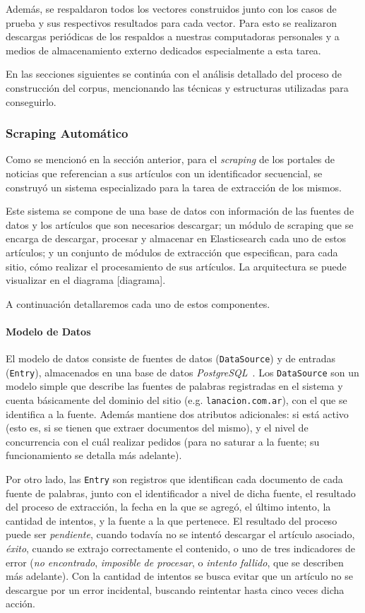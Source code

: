 Además, se respaldaron todos los vectores construidos junto con los casos de prueba y sus respectivos
resultados para cada vector. Para esto se realizaron descargas periódicas de los respaldos a nuestras
computadoras personales y a medios de almacenamiento externo dedicados especialmente a esta
tarea.

En las secciones siguientes se continúa con el análisis detallado del proceso de construcción del corpus,
mencionando las técnicas y estructuras utilizadas para conseguirlo.


\subsubsection{Scraping Automático}

Como se mencionó en la sección anterior, para el \textit{scraping} de los portales de noticias que
referencian a sus artículos con un identificador secuencial, se construyó un sistema especializado
para la tarea de extracción de los mismos.

Este sistema se compone de una base de datos con información de las fuentes de datos y los
artículos que son necesarios descargar; un módulo de scraping que se encarga de descargar, procesar
y almacenar en Elasticsearch cada uno de estos artículos; y un conjunto de módulos de extracción que
especifican, para cada sitio, cómo realizar el procesamiento de sus artículos. La arquitectura se
puede visualizar en el diagrama [diagrama].

A continuación detallaremos cada uno de estos componentes.


\paragraph{Modelo de Datos}

El modelo de datos consiste de fuentes de datos (\texttt{DataSource}) y de entradas
(\texttt{Entry}), almacenados en una base de datos \textit{PostgreSQL}~\cite{PostgreSQL}. Los
\texttt{DataSource} son un modelo simple que describe las fuentes de palabras registradas en el
sistema y cuenta básicamente del dominio del sitio (e.g. \texttt{lanacion.com.ar}), con el que se
identifica a la fuente. Además mantiene dos atributos adicionales: si está activo (esto es, si se
tienen que extraer documentos del mismo), y el nivel de concurrencia con el cuál realizar pedidos
(para no saturar a la fuente; su funcionamiento se detalla más adelante).

Por otro lado, las \texttt{Entry} son registros que identifican cada documento de cada fuente de
palabras, junto con el identificador a nivel de dicha fuente, el resultado del proceso de
extracción, la fecha en la que se agregó, el último intento, la cantidad de intentos, y la fuente a
la que pertenece. El resultado del proceso puede ser \textit{pendiente}, cuando todavía no se
intentó descargar el artículo asociado, \textit{éxito}, cuando se extrajo correctamente el
contenido, o uno de tres indicadores de error (\textit{no encontrado}, \textit{imposible de
procesar}, o \textit{intento fallido}, que se describen más adelante). Con la cantidad de intentos
se busca evitar que un artículo no se descargue por un error incidental, buscando reintentar hasta
cinco veces dicha acción.

